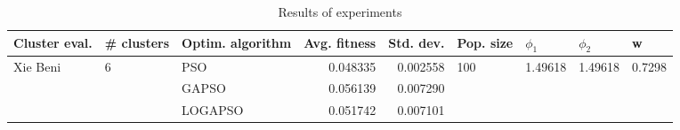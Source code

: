 \begin{table}
\centering
\caption{Results of experiments}
\begin{tabular}{lllrrllll}
\toprule
            Cluster eval. &        \# clusters & Optim. algorithm &  Avg. fitness &  Std. dev. &            Pop. size &               $\phi_{1}$ &               $\phi_{2}$ &                       w \\
\midrule
\multirow{3}{*}{Xie Beni} & \multirow{3}{*}{6} &              PSO &      0.048335 &   0.002558 & \multirow{3}{*}{100} & \multirow{3}{*}{1.49618} & \multirow{3}{*}{1.49618} & \multirow{3}{*}{0.7298} \\
                          &                    &            GAPSO &      0.056139 &   0.007290 &                      &                          &                          &                         \\
                          &                    &          LOGAPSO &      0.051742 &   0.007101 &                      &                          &                          &                         \\
\bottomrule
\end{tabular}
\end{table}
